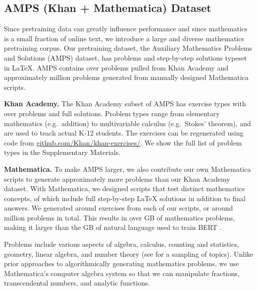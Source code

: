 \documentclass{article}
\begin{document}
\subsection{AMPS (Khan + Mathematica) Dataset}
Since pretraining data can greatly influence performance \citep{Hernandez2021ScalingLF,Gururangan2020DontSP} and since mathematics is a small fraction of online text, we introduce a large and diverse mathematics pretraining corpus. Our pretraining dataset, the Auxiliary Mathematics Problems and Solutions (AMPS) dataset, has problems and step-by-step solutions typeset in \LaTeX{}. AMPS contains over  problems pulled from Khan Academy and approximately  million problems generated from manually designed Mathematica scripts.

\textbf{Khan Academy.}\quad
The Khan Academy subset of AMPS has  exercise types with over  problems and full solutions. Problem types range from elementary mathematics (e.g.~addition) to multivariable calculus (e.g.~Stokes' theorem), and are used to teach actual K-12 students. The exercises can be regenerated using code from \href{https://github.com/Khan/khan-exercises/}{github.com/Khan/khan-exercises/}. We show the full list of problem types in the Supplementary Materials. 

\textbf{Mathematica.}\quad
To make AMPS larger, we also contribute our own Mathematica scripts to generate approximately  more problems than our Khan Academy dataset. With Mathematica, we designed  scripts that test distinct mathematics concepts,  of which include full step-by-step \LaTeX{} solutions in addition to final answers. We generated around  exercises from each of our scripts, or around  million problems in total. This results in over  GB of mathematics problems, making it larger than the  GB of natural language used to train BERT \citep{Devlin2019BERTPO}.

Problems include various aspects of algebra, calculus, counting and statistics, geometry, linear algebra, and number theory (see  for a sampling of topics). Unlike prior approaches to algorithmically generating mathematics problems, we use Mathematica's computer algebra system so that we can manipulate fractions, transcendental numbers, and analytic functions. 


    
    
    
\end{document}
